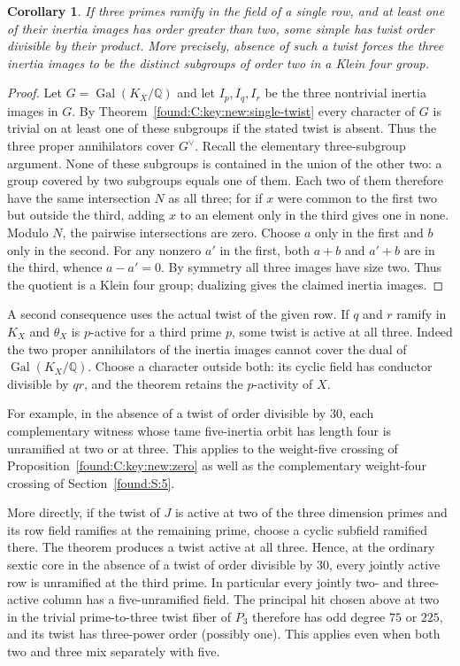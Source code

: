 \documentclass[11pt,a4paper]{article}
\numberwithin{equation}{section}
\newtheorem{corollary}[theorem]{Corollary}
\theoremstyle{remark}
\newcommand{\QQ}{\mathbb Q}
\begin{document}
\begin{corollary}\label{found:C:7.3}\label{found:C:key:new:klein}
If three primes ramify in the field of a single row, and at least
one of their inertia images has order greater than two, some simple
has twist order divisible by their product. More precisely, absence
of such a twist forces the three inertia images to be the distinct
subgroups of order two in a Klein four group.
\end{corollary}
\begin{proof}
Let $G=\operatorname{Gal}(K_X/\QQ)$ and let $I_p,I_q,I_r$ be the
three nontrivial inertia images in $G$. By Theorem~\ref{found:C:key:new:single-twist}
every character of $G$ is trivial on at least one of these subgroups
if the stated twist is absent. Thus the three proper annihilators
cover $G^\vee$. Recall the elementary three-subgroup argument.
None of these subgroups is contained in the union of the other two:
a group covered by two subgroups equals one of them. Each two of
them therefore have the same intersection $N$ as all three; for if
$x$ were common to the first two but outside the third, adding $x$
to an element only in the third gives one in none. Modulo $N$, the
pairwise intersections are zero. Choose $a$ only in the first and
$b$ only in the second. For any nonzero $a'$ in the first, both
$a+b$ and $a'+b$ are in the third, whence $a-a'=0$.
By symmetry all three images have size two. Thus the quotient
is a Klein four group; dualizing gives the claimed inertia images.
\end{proof}

A second consequence uses the actual twist of the given row. If
$q$ and $r$ ramify in $K_X$ and $\theta_X$ is $p$-active for a
third prime $p$, some twist is active at all three. Indeed the two
proper annihilators of the inertia images cannot cover the dual of
$\operatorname{Gal}(K_X/\QQ)$. Choose a character outside both:
its cyclic field has conductor divisible by $qr$, and the theorem
retains the $p$-activity of $X$.

For example, in the absence of a twist of order divisible by $30$,
each complementary witness whose tame five-inertia orbit has
length four is unramified at two or at three. This applies to the
weight-five crossing of Proposition~\ref{found:C:key:new:zero} as well as
the complementary weight-four crossing of Section~\ref{found:S:5}.

More directly, if the twist of $J$ is active at two of the three
dimension primes and its row field ramifies at the remaining prime,
choose a cyclic subfield ramified there. The theorem produces a twist
active at all three. Hence, at the ordinary sextic core in the absence
of a twist of order divisible by $30$, every jointly active row is
unramified at the third prime. In particular every jointly two- and
three-active column has a five-unramified field. The principal hit
chosen above at two in the trivial prime-to-three twist fiber of
$P_3$ therefore has odd degree $75$ or $225$, and its twist has
three-power order (possibly one). This applies even when both two and
three mix separately with five.
\end{document}
